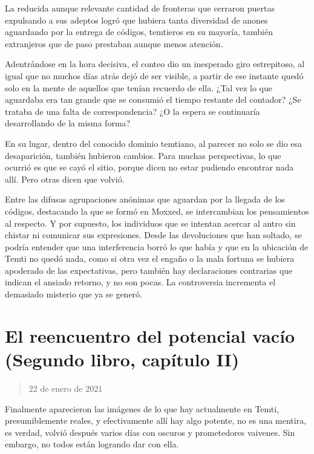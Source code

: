 \documentclass[
]{book}
\begin{document}
La reducida aunque relevante cantidad de fronteras que cerraron puertas expulsando a sus adeptos logró que hubiera tanta diversidad de anones aguardando por la entrega de códigos, temtieros en su mayoría, también extranjeros que de paso prestaban aunque menos atención.

Adentrándose en la hora decisiva, el conteo dio un inesperado giro estrepitoso, al igual que no muchos días atrás dejó de ser visible, a partir de ese instante quedó solo en la mente de aquellos que tenían recuerdo de ella. ¿Tal vez lo que aguardaba era tan grande que se consumió el tiempo restante del contador? ¿Se trataba de una falta de correspondencia? ¿O la espera se continuaría desarrollando de la misma forma?

En su lugar, dentro del conocido dominio temtiano, al parecer no solo se dio esa desaparición, también hubieron cambios. Para muchas perspectivas, lo que ocurrió es que se cayó el sitio, porque dicen no estar pudiendo encontrar nada allí. Pero otras dicen que volvió.

Entre las difusas agrupaciones anónimas que aguardan por la llegada de los códigos, destacando la que se formó en Moxxed, se intercambian los pensamientos al respecto. Y por supuesto, los individuos que se intentan acercar al antro sin chistar ni comunicar sus expresiones. Desde las devoluciones que han soltado, se podría entender que una interferencia borró lo que había y que en la ubicación de Temti no quedó nada, como si otra vez el engaño o la mala fortuna se hubiera apoderado de las expectativas, pero también hay declaraciones contrarias que indican el ansiado retorno, y no son pocas. La controversia incrementa el demasiado misterio que ya se generó.

\hypertarget{el-reencuentro-del-potencial-vacuxedo-segundo-libro-capuxedtulo-ii}{%
\section{El reencuentro del potencial vacío (Segundo libro, capítulo II)}\label{el-reencuentro-del-potencial-vacuxedo-segundo-libro-capuxedtulo-ii}}

\begin{quote}
22 de enero de 2021
\end{quote}

Finalmente aparecieron las imágenes de lo que hay actualmente en Temti, presumiblemente reales, y efectivamente allí hay algo potente, no es una mentira, es verdad, volvió después varios días con oscuros y prometedores vaivenes. Sin embargo, no todos están logrando dar con ella.
\end{document}
